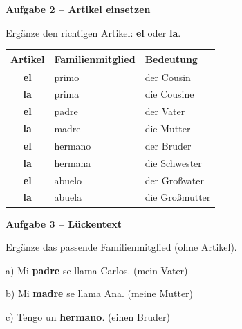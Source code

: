 \documentclass[11pt, a4paper]{article}
\newcommand{\fachfarbe}{spanisch}
\newcommand{\punktebox}[1]{\hfill\fbox{\small \_/#1}}
\newcommand{\lsg}[1]{\textcolor{loesung}{\textbf{#1}}}
\newenvironment{aufgabe}[1]{%
    \needspace{5\baselineskip}%
    \nopagebreak[4]%
    \vspace{10pt}
    \noindent\textbf{\textcolor{\fachfarbe}{Aufgabe #1}}
    \nopagebreak[4]%
    \vspace{5pt}
    \nopagebreak[4]%
    \begin{list}{}{\leftmargin=0pt}
    \item[]
}{%
    \end{list}
}
\newcommand{\es}[1]{\textcolor{\fachfarbe}{\textbf{#1}}}
\begin{document}
\vspace{15pt}


\begin{aufgabe}{2 -- Artikel einsetzen}
Ergänze den richtigen Artikel: \es{el} oder \es{la}. \punktebox{8}
\end{aufgabe}

\noindent
\begin{tabularx}{\textwidth}{|c|X|X|}
\hline
\textbf{Artikel} & \textbf{Familienmitglied} & \textbf{Bedeutung} \\
\hline
\lsg{el} & primo & der Cousin \\[0.6em]
\hline
\lsg{la} & prima & die Cousine \\[0.6em]
\hline
\lsg{el} & padre & der Vater \\[0.6em]
\hline
\lsg{la} & madre & die Mutter \\[0.6em]
\hline
\lsg{el} & hermano & der Bruder \\[0.6em]
\hline
\lsg{la} & hermana & die Schwester \\[0.6em]
\hline
\lsg{el} & abuelo & der Großvater \\[0.6em]
\hline
\lsg{la} & abuela & die Großmutter \\[0.6em]
\hline
\end{tabularx}

\vspace{15pt}


\begin{aufgabe}{3 -- Lückentext}
Ergänze das passende Familienmitglied (ohne Artikel). \punktebox{10}
\end{aufgabe}

\noindent
a) Mi \lsg{padre} se llama Carlos. \hfill (mein Vater)

\vspace{0.8em}

\noindent
b) Mi \lsg{madre} se llama Ana. \hfill (meine Mutter)

\vspace{0.8em}

\noindent
c) Tengo un \lsg{hermano}. \hfill (einen Bruder)
\end{document}
